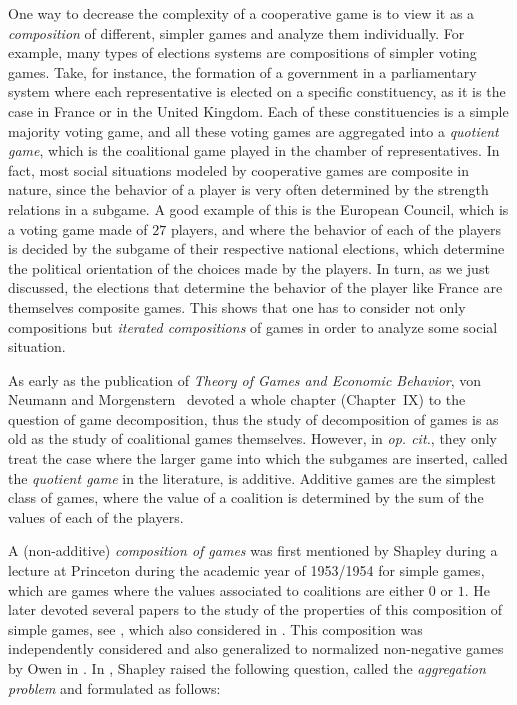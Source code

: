 \documentclass[a4paper,12pt]{amsart}
\begin{document}
One way to decrease the complexity of a cooperative game is to view it as a \textit{composition} of different, simpler games and analyze them individually. For example, many types of elections systems are compositions of simpler voting games. Take, for instance, the formation of a government in a parliamentary system where each representative is elected on a specific constituency, as it is the case in France or in the United Kingdom. Each of these constituencies is a simple majority voting game, and all these voting games are aggregated into a \emph{quotient game}, which is the coalitional game played in the chamber of representatives. In fact, most social situations modeled by cooperative games are composite in nature, since the behavior of a player is very often determined by the strength relations in a subgame. A good example of this is the European Council, which is a voting game made of $27$ players, and where the behavior of each of the players is decided by the subgame of their respective national elections, which determine the political orientation of the choices made by the players. In turn, as we just discussed, the elections that determine the behavior of the player like France are themselves composite games. This shows that one has to consider not only compositions but \textit{iterated compositions} of games in order to analyze some social situation. 

\medskip

As early as the publication of \emph{Theory of Games and Economic Behavior}, von Neumann and Morgenstern~\cite{vonNeumann2} devoted a whole chapter (Chapter~IX) to the question of game decomposition, thus the study of decomposition of games is as old as the study of coalitional games themselves. However, in \textit{op. cit.}, they only treat the case where the larger game into which the subgames are inserted, called the \textit{quotient game} in the literature, is additive. Additive games are the simplest class of games, where the value of a coalition is determined by the sum of the values of each of the players. 

\medskip

A (non-additive) \textit{composition of games} was first mentioned by Shapley during a lecture at Princeton during the academic year of 1953/1954 \cite{shapley1954simple} for simple games, which are games where the values associated to coalitions are either $0$ or $1$. He later devoted several papers to the study of the properties of this composition of simple games, see \cite{ShapleyCompoundIII, ShapleyCompoundI, ShapleyCompoundII, ShapleyComposition}, which also considered in \cite{birnbaum1965modules}. This composition was independently considered and also generalized to normalized non-negative games by Owen in \cite{OwenTensor}. In \cite{ShapleyCompoundII}, Shapley raised the following question, called the \emph{aggregation problem} and formulated as follows: 
\end{document}
